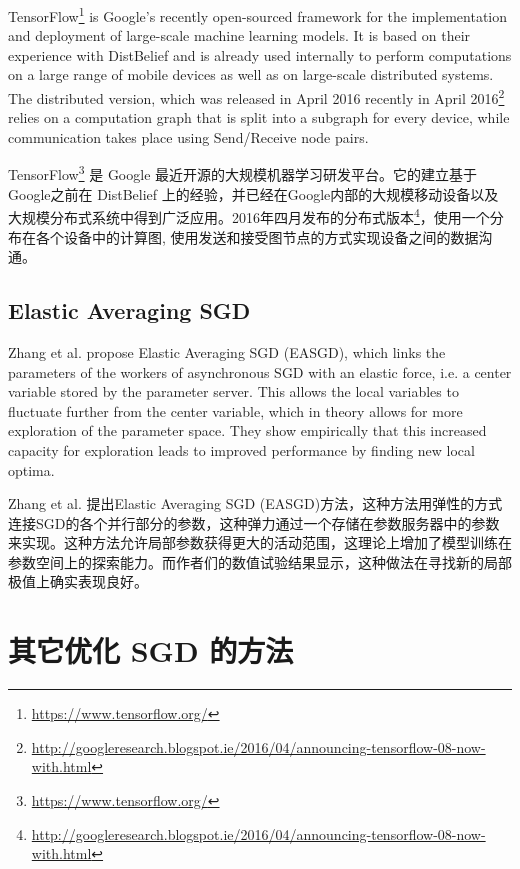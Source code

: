 \documentclass{article}
\begin{document}
TensorFlow\footnote{\url{https://www.tensorflow.org/}} \cite{Abadi2015a} is Google's recently open-sourced framework for the implementation and deployment of large-scale machine learning models. It is based on their experience with DistBelief and is already used internally to perform computations on a large range of mobile devices as well as on large-scale distributed systems. The distributed version, which was released in April 2016 recently in April 2016\footnote{\url{http://googleresearch.blogspot.ie/2016/04/announcing-tensorflow-08-now-with.html}} relies on a computation graph that is split into a subgraph for every device, while communication takes place using Send/Receive node pairs.

TensorFlow\footnote{\url{https://www.tensorflow.org/}} \cite{Abadi2015a} 是 Google 最近开源的大规模机器学习研发平台。它的建立基于Google之前在 DistBelief 上的经验，并已经在Google内部的大规模移动设备以及大规模分布式系统中得到广泛应用。2016年四月发布的分布式版本\footnote{\url{http://googleresearch.blogspot.ie/2016/04/announcing-tensorflow-08-now-with.html}}，使用一个分布在各个设备中的计算图, 使用发送和接受图节点的方式实现设备之间的数据沟通。

\subsection{Elastic Averaging SGD}

Zhang et al. \cite{Zhang2014} propose Elastic Averaging SGD (EASGD), which links the parameters of the workers of asynchronous SGD with an elastic force, i.e. a center variable stored by the parameter server. This allows the local variables to fluctuate further from the center variable, which in theory allows for more exploration of the parameter space. They show empirically that this increased capacity for exploration leads to improved performance by finding new local optima.

Zhang et al. \cite{Zhang2014} 提出Elastic Averaging SGD (EASGD)方法，这种方法用弹性的方式连接SGD的各个并行部分的参数，这种弹力通过一个存储在参数服务器中的参数来实现。这种方法允许局部参数获得更大的活动范围，这理论上增加了模型训练在参数空间上的探索能力。而作者们的数值试验结果显示，这种做法在寻找新的局部极值上确实表现良好。

\section{其它优化 SGD 的方法} \label{sec:strategies}
\end{document}
